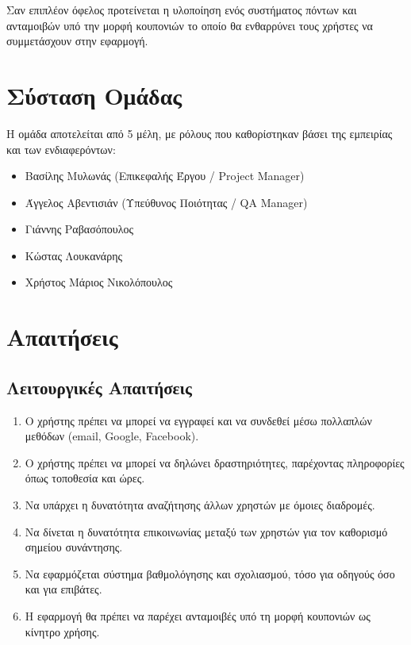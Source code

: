 \documentclass[11pt]{article}
\begin{document}
Σαν επιπλέον όφελος προτείνεται η υλοποίηση ενός συστήματος πόντων και ανταμοιβών
υπό την μορφή κουπονιών το οποίο θα ενθαρρύνει τους χρήστες να συμμετάσχουν
στην εφαρμογή.

\newpage

\section{Σύσταση Ομάδας}
Η ομάδα αποτελείται από 5 μέλη, με ρόλους που καθορίστηκαν βάσει της εμπειρίας και των ενδιαφερόντων:
\begin{itemize}
    \item Βασίλης Μυλωνάς (Επικεφαλής Έργου / Project Manager)
    \item Άγγελος Αβεντισιάν (Υπεύθυνος Ποιότητας / QA Manager)
    \item Γιάννης Ραβασόπουλος
    \item Κώστας Λουκανάρης
    \item Χρήστος Μάριος Νικολόπουλος
\end{itemize}

\newpage

\section{Απαιτήσεις}

\subsection{Λειτουργικές Απαιτήσεις}

\begin{enumerate}
    \item Ο χρήστης πρέπει να μπορεί να εγγραφεί και να συνδεθεί μέσω πολλαπλών μεθόδων (email, Google, Facebook).
    \item Ο χρήστης πρέπει να μπορεί να δηλώνει δραστηριότητες, παρέχοντας πληροφορίες όπως τοποθεσία και ώρες.
    \item Να υπάρχει η δυνατότητα αναζήτησης άλλων χρηστών με όμοιες διαδρομές.
    \item Να δίνεται η δυνατότητα επικοινωνίας μεταξύ των χρηστών για τον καθορισμό σημείου συνάντησης.
    \item Να εφαρμόζεται σύστημα βαθμολόγησης και σχολιασμού, τόσο για οδηγούς όσο και για επιβάτες.
    \item Η εφαρμογή θα πρέπει να παρέχει ανταμοιβές υπό τη μορφή κουπονιών ως κίνητρο χρήσης.
\end{enumerate}
\end{document}
